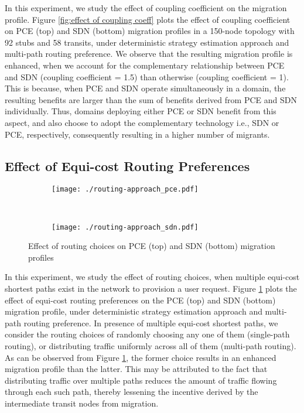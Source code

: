 \documentclass[smallextended]{svjour3}
\begin{document}
In this experiment, we study the effect of coupling coefficient on the migration
profile. Figure \ref{fig:effect of coupling coeff} plots the effect of coupling
coefficient on PCE (top) and SDN (bottom) migration profiles in a 150-node
topology with 92 stubs and 58 transits, under deterministic strategy estimation
approach and multi-path routing preference. We observe that the resulting
migration profile is enhanced, when we account for the complementary
relationship between PCE and SDN (coupling coefficient = 1.5) than otherwise
(coupling coefficient = 1).
This is because, when PCE and SDN operate simultaneously in a domain, the
resulting benefits are larger than the sum of benefits derived from PCE and SDN
individually. Thus, domains deploying either PCE or SDN benefit from this
aspect, and also choose to adopt the complementary technology i.e.,  SDN or PCE,
respectively, consequently resulting in a higher number of migrants.

\subsection{Effect of Equi-cost Routing Preferences}

\begin{figure}
\centering
\begin{subfigure}
\centering
\texttt{[image: ./routing-approach\_pce.pdf]}
\end{subfigure}~ \begin{subfigure}
\centering
\texttt{[image: ./routing-approach\_sdn.pdf]}
\end{subfigure}
\caption{Effect of routing choices on PCE (top) and SDN (bottom)
migration profiles}
\label{fig:effect of routing approaches}
\end{figure}

In this experiment, we study the effect of routing choices, when multiple
equi-cost shortest paths exist in the network to provision a user request.
Figure \ref{fig:effect of routing approaches} plots the effect of equi-cost
routing preferences on the PCE (top) and SDN (bottom) migration profile, under
deterministic strategy estimation approach and multi-path routing preference. In
presence of multiple equi-cost shortest paths, we consider the routing choices
of randomly choosing any one of them (single-path routing), or distributing
traffic uniformly across all of them (multi-path routing). As can be observed
from Figure \ref{fig:effect of routing approaches}, the former choice results in an enhanced migration profile than the latter.
This may be attributed to the fact that distributing traffic over multiple paths
reduces the amount of traffic flowing through each such path, thereby lessening
the incentive derived by the intermediate transit nodes from migration.
\end{document}
